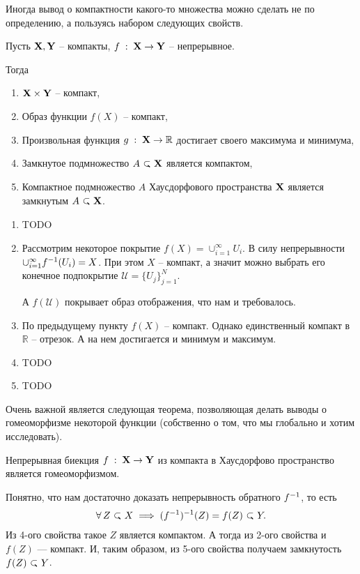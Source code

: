 Иногда вывод о компактности какого-то множества можно сделать не по определению, а пользуясь набором следующих свойств.
\begin{Lem}
    Пусть $\mathbf{X}, \mathbf{Y}$ -- компакты, $f\; : \; \mathbf{X} \to \mathbf{Y}$ -- непрерывное.

    Тогда
    \begin{enumerate}
        \item $\mathbf{X} \times \mathbf{Y}$ -- компакт,
        \item Образ функции $f(X)$ -- компакт,
        \item Произвольная функция  $g\; : \; \mathbf{X} \to \mathbb{R}$ достигает своего максимума и минимума,
        \item Замкнутое подмножество $A \closed \X$ является компактом,
        \item Компактное подмножество $A$ Хаусдорфового пространства $\mathbf{X}$ является замкнутым $A \closed \X$.
    \end{enumerate}
\end{Lem}
\begin{Proof}
    \begin{enumerate}
        \item TODO
    \item Рассмотрим некоторое покрытие $f(X) = \cup_{i=1}^\infty U_i$. В силу непрерывности $\cup_{i=1}^\infty f^{-1}(U_i) = X$. При этом $X$ -- компакт, а значит можно выбрать его конечное подпокрытие $\mathcal{U} = \{ U_j \}_{j=1}^{N}$. 

        А $f(\mathcal{U} )$ покрывает образ отображения, что нам и требовалось.
    \item По предыдущему пункту  $f(X)$ -- компакт. Однако единственный компакт в $\mathbb{R}$ -- отрезок. А на нем достигается и минимум и максимум.
    \item TODO
    \item TODO
    \end{enumerate}
\end{Proof}

Очень важной является следующая теорема, позволяющая делать выводы о гомеоморфизме некоторой функции (собственно о том, что мы глобально и хотим исследовать).
\begin{Th}
    Непрерывная биекция $f\; : \; \mathbf{X} \to \mathbf{Y}$ из компакта в Хаусдорфово пространство является гомеоморфизмом.
\end{Th}
\begin{Proof}
    Понятно, что нам достаточно доказать непрерывность обратного $f^{-1}$, то есть 
    \[
        \forall Z \closed X \implies \inv{(\inv{f})} (Z) = f(Z)  \closed Y.
    \] 
    Из 4-ого свойства такое $Z$ является компактом. А тогда из 2-ого свойства и $f(Z)$ --- компакт. И, таким образом, из 5-ого свойства получаем замкнутость $f(Z) \closed Y$.
\end{Proof}

